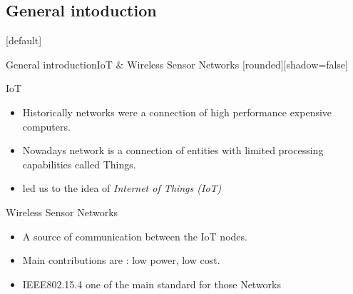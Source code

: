 \documentclass{beamer}
\makeatletter
\newenvironment{withoutheadline}{
        \setbeamertemplate{headline}[default]
        \def\beamer@entrycode{\vspace*{-\headheight}}
    }{}
\makeatother
\begin{document}
\subsection{General intoduction}
\begin{withoutheadline}
\begin{frame}{General introduction}{IoT \& Wireless Sensor Networks}
[rounded][shadow=false]
 \begin{block}{IoT}
    \begin{itemize}
    \item Historically networks were a connection of high performance expensive computers.
    \item<2-> Nowadays network is a connection of entities with limited processing capabilities called Things. 
    \item<3->  led us to the idea of {\em Internet of Things (IoT)}
    \end{itemize}
  \end{block} 
  
  
\begin{block}{Wireless Sensor Networks}
    \begin{itemize}
    \item<4-> A source of communication between the IoT nodes.
    \item<5-> Main contributions are : low power, low cost.
    \item<6->  IEEE802.15.4 one of the main standard for those Networks
    \end{itemize}
    \end{block}

  
  
\end{frame}
\end{withoutheadline}
\end{document}
